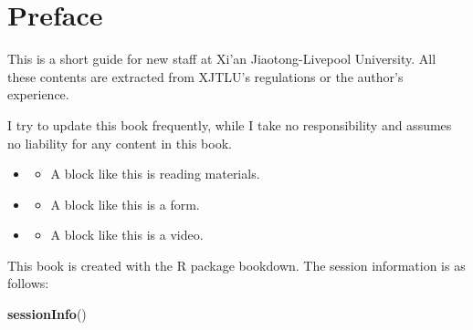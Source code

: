 \documentclass[
]{book}
\author{}
\date{\vspace{-2.5em}}
\newenvironment{Shaded}{\begin{snugshade}}{\end{snugshade}}
\newcommand{\KeywordTok}[1]{\textcolor[rgb]{0.13,0.29,0.53}{\textbf{#1}}}
\newcommand{\NormalTok}[1]{#1}
\newenvironment{rmdblock}[1]
  {\begin{shaded*}
  \begin{itemize}
  \renewcommand{\labelitemi}{
    \raisebox{-.7\height}[0pt][0pt]{
      {\setkeys{Gin}{width=2em,keepaspectratio}\texttt{[image: image/\#1]}}
    }
  }
  \item
  }
  {
  \end{itemize}
  \end{shaded*}
  }
\newenvironment{rmdas}
  {\begin{rmdblock}{as}}
  {\end{rmdblock}}
\newenvironment{rmdvd}
  {\begin{rmdblock}{vd}}
  {\end{rmdblock}}
\newenvironment{rmdrd}
  {\begin{rmdblock}{rd}}
  {\end{rmdblock}}
\begin{document}


\thispagestyle{empty}

\setlength{\abovedisplayskip}{-5pt}
\setlength{\abovedisplayshortskip}{-5pt}

{
\hypersetup{linkcolor=}
\setcounter{tocdepth}{1}
\tableofcontents
}
\frontmatter

\hypertarget{preface}{%
\chapter{Preface}\label{preface}}

This is a short guide for new staff at Xi'an Jiaotong-Livepool University. All these contents are extracted from XJTLU's regulations or the author's experience.

I try to update this book frequently, while I take no responsibility and assumes no liability for any content in this book.

\begin{rmdrd}
\begin{rmdrd}

A block like this is reading materials.

\end{rmdrd}
\end{rmdrd}

\begin{rmdas}
\begin{rmdas}

A block like this is a form.

\end{rmdas}
\end{rmdas}

\begin{rmdvd}
\begin{rmdvd}

A block like this is a video.

\end{rmdvd}
\end{rmdvd}

This book is created with the R package bookdown. The session information is as follows:

\begin{Shaded}
\begin{Highlighting}[]
\KeywordTok{sessionInfo}\NormalTok{()}
\end{Highlighting}
\end{Shaded}
\end{document}
